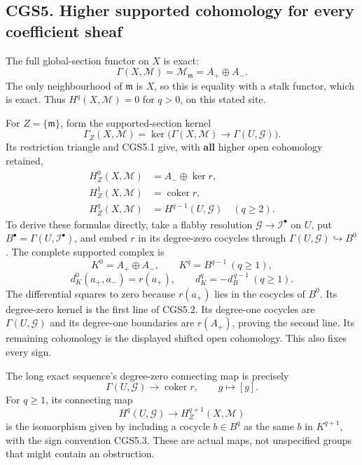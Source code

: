 \subsection{CGS5. Higher supported cohomology for every coefficient
sheaf}\label{cgs5.-higher-supported-cohomology-for-every-coefficient-sheaf}

The full global-section functor on \(X\) is exact: \[
 \Gamma(X,\mathcal M)=\mathcal M_{\mathfrak m}=A_+\oplus A_-.
\tag{CGS5.1}
\] The only neighbourhood of \(\mathfrak m\) is \(X\), so this is
equality with a stalk functor, which is exact. Thus
\(H^q(X,\mathcal M)=0\) for \(q>0\), on this stated site.

For \(Z=\{\mathfrak m\}\), form the supported-section kernel \[
 \Gamma_Z(X,\mathcal M)=
 \ker\bigl(\Gamma(X,\mathcal M)\to\Gamma(U,\mathcal G)\bigr).
\] Its restriction triangle and CGS5.1 give, with \textbf{all} higher
open cohomology retained, \[
 \boxed{
 \begin{aligned}
 H_Z^0(X,\mathcal M)&=A_-\oplus\ker r,\\
 H_Z^1(X,\mathcal M)&=\operatorname{coker}r,\\
 H_Z^q(X,\mathcal M)&=H^{q-1}(U,\mathcal G)\quad(q\ge2).
 \end{aligned}}
\tag{CGS5.2}
\] To derive these formulas directly, take a flabby resolution
\(\mathcal G\to\mathcal I^\bullet\) on \(U\), put
\(B^\bullet=\Gamma(U,\mathcal I^\bullet)\), and embed \(r\) in its
degree-zero cocycles through
\(\Gamma(U,\mathcal G)\hookrightarrow B^0\). The complete supported
complex is \[
 K^0=A_+\oplus A_-,\qquad
 K^q=B^{q-1}\ (q\ge1),
\] \[
 d_K^0(a_+,a_-)=r(a_+),\qquad
 d_K^q=-d_B^{\,q-1}\ (q\ge1).
\tag{CGS5.3}
\] The differential squares to zero because \(r(a_+)\) lies in the
cocycles of \(B^0\). Its degree-zero kernel is the first line of CGS5.2.
Its degree-one cocycles are \(\Gamma(U,\mathcal G)\) and its degree-one
boundaries are \(r(A_+)\), proving the second line. Its remaining
cohomology is the displayed shifted open cohomology. This also fixes
every sign.

The long exact sequence's degree-zero connecting map is precisely \[
 \Gamma(U,\mathcal G)\longrightarrow\operatorname{coker}r,
 \qquad g\longmapsto[g].
\tag{CGS5.4}
\] For \(q\ge1\), its connecting map \[
 H^q(U,\mathcal G)\longrightarrow H_Z^{q+1}(X,\mathcal M)
\] is the isomorphism given by including a cocycle \(b\in B^q\) as the
same \(b\) in \(K^{q+1}\), with the sign convention CGS5.3. These are
actual maps, not unspecified groups that might contain an obstruction.

